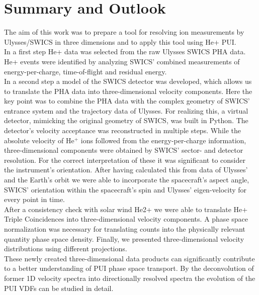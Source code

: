 
\chapter{Summary and Outlook} %

\label{chap:concl} %



The aim of this work was to prepare a tool for resolving ion measurements by Ulysses/SWICS in three dimensions and to apply this tool using He+ PUI.\\
In a first step He+ data was selected from the raw Ulysses SWICS PHA data.
He+ events were identified by analyzing SWICS' combined measurements of energy-per-charge, time-of-flight and residual energy.\\
In a second step a model of the SWICS detector was developed, which allows us to translate the PHA data into three-dimensional velocity components.
Here the key point was to combine the PHA data with the complex geometry of SWICS' entrance system and the trajectory data of Ulysses. For realizing this, a virtual detector, mimicking the original geometry of SWICS, was built in Python. 
The detector's velocity acceptance was reconstructed in multiple steps. While the absolute velocity of $\mathrm{He^+}$ ions followed from the energy-per-charge information, three-dimensional components were obtained by SWICS' sector- and detector resolution. For the correct interpretation of these it was significant to consider the instrument's orientation. After having calculated this from data of Ulysses' and the Earth's orbit we were able to incorporate the spacecraft's aspect angle, SWICS' orientation within the spacecraft's spin and Ulysses' eigen-velocity for every point in time.\\
After a consistency check with solar wind He2+ we were able to translate He+ Triple Coincidences into three-dimensional velocity components.
A phase space normalization was necessary for translating counts into the physically relevant quantity phase space density.
Finally, we presented three-dimensional velocity distributions using different projections. 
\\
These newly created three-dimensional data products can significantly contribute to a better understanding of PUI phase space transport. By the deconvolution of former 1D velocity spectra into directionally resolved spectra the evolution of the PUI VDFs can be studied in detail.

